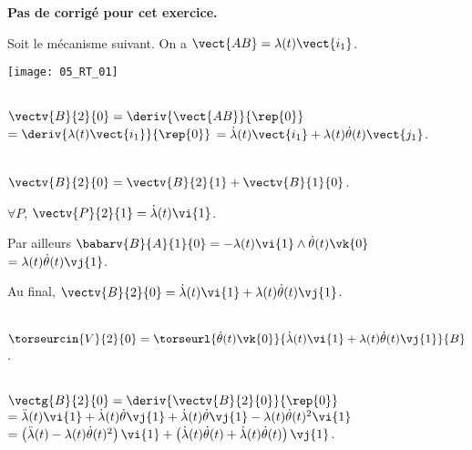 \normaltrue
\correctiontrue


\setcounter{numques}{0}
\ifcorrection
\else
\textbf{Pas de corrigé pour cet exercice.}
\fi

\ifprof
\else
Soit le mécanisme suivant. On a $\vect{AB}=\lambda(t)\vect{i_1}$.
\begin{center}
\texttt{[image: 05\_RT\_01]}
\end{center}
\fi

\ifprof  ~\\
$\vectv{B}{2}{0} = \deriv{\vect{AB}}{\rep{0}}$ $=\deriv{\lambda(t)\vect{i_1}}{\rep{0}}$
$=\dot{\lambda}(t)\vect{i_1}+\lambda(t)\dot{\theta}(t)\vect{j_1}$.
\else
\fi


\ifprof ~\\
$\vectv{B}{2}{0}=\vectv{B}{2}{1}+\vectv{B}{1}{0}$.

$\forall P$, $\vectv{P}{2}{1}=\dot{\lambda}(t)\vi{1}$.

Par ailleurs $\babarv{B}{A}{1}{0}=-\lambda(t)\vi{1}\wedge\dot{\theta}(t)\vk{0}$
$=\lambda(t)\dot{\theta}(t)\vj{1}$.

Au final, $\vectv{B}{2}{0}=\dot{\lambda}(t)\vi{1}+\lambda(t)\dot{\theta}(t)\vj{1}$.

\else
\fi

\ifprof  ~\\
$\torseurcin{V}{2}{0} = \torseurl{\dot{\theta}(t)\vk{0}}{\dot{\lambda}(t)\vi{1}+\lambda(t)\dot{\theta}(t)\vj{1}}{B}$.
\else
\fi

\ifprof  ~\\
$\vectg{B}{2}{0} = \deriv{\vectv{B}{2}{0}}{\rep{0}}$
$ = \ddot{\lambda}(t)\vi{1}+  \dot{\lambda}(t)\dot{\theta}\vj{1}+\dot{\lambda}(t)\dot{\theta}\vj{1}-\lambda(t)\dot{\theta}(t)^2\vi{1}$
$ = \left( \ddot{\lambda}(t)-\lambda(t)\dot{\theta}(t)^2\right)\vi{1}  +  \left( \dot{\lambda}(t)\dot{\theta}(t) +\dot{\lambda}(t)\dot{\theta}(t)\right) \vj{1}$.
\else
\fi


